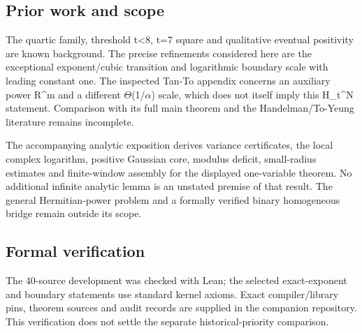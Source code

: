 \documentclass[11pt,a4paper]{article}
\begin{document}
\subsection{Prior work and scope}
The quartic family, threshold t<8, t=7 square and qualitative eventual positivity are known background. The precise refinements considered here are the exceptional exponent/cubic transition and logarithmic boundary scale with leading constant one. The inspected Tan-To appendix concerns an auxiliary power R\textasciicircum{}m and a different \ensuremath{\Theta}(1/\ensuremath{\alpha}) scale, which does not itself imply this H\_t\textasciicircum{}N statement. Comparison with its full main theorem and the Handelman/To-Yeung literature remains incomplete.

The accompanying analytic exposition derives variance certificates, the local complex logarithm, positive Gaussian core, modulus deficit, small-radius estimates and finite-window assembly for the displayed one-variable theorem. No additional infinite analytic lemma is an unstated premise of that result. The general Hermitian-power problem and a formally verified binary homogeneous bridge remain outside its scope.

\subsection{Formal verification}
The 40-source development was checked with Lean; the selected exact-exponent and boundary statements use standard kernel axioms. Exact compiler/library pins, theorem sources and audit records are supplied in the companion repository. This verification does not settle the separate historical-priority comparison.
\end{document}
